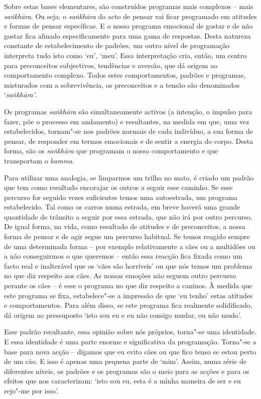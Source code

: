 Sobre estas bases elementares, são construídos programas mais complexos -- mais
\emph{saṅkhāra}. Ou seja: o \emph{saṅkhāra} do acto de pensar vai ficar
programado em atitudes e formas de pensar específicas. E o nosso programa
emocional de gostar e de não gostar fica afinado especificamente para uma gama
de respostas. Desta natureza constante de estabelecimento de padrões, um outro
nível de programação interpreta tudo isto como `eu', `meu'. Essa interpretação
cria, então, um centro para preconceitos subjectivos, tendências e aversão, que
dá origem ao comportamento complexo. Todos estes comportamentos, padrões e
programas, misturados com a sobrevivência, os preconceitos e a tensão são
denominados `\emph{saṅkhāra'}.

Os programas \emph{saṅkhāra} são simultaneamente activos (a intenção, o impulso
para fazer, põe o processo em andamento) e resultantes, na medida em que, uma
vez estabelecidos, tornam"-se nos padrões normais de cada indivíduo, a sua forma
de pensar, de responder em termos emocionais e de sentir a energia do corpo.
Desta forma, são os \emph{saṅkhāra} que programam o nosso comportamento e que
transportam o \emph{kamma}.

Para utilizar uma analogia, se limparmos um trilho no mato, é criado um padrão
que tem como resultado encorajar os outros a seguir esse caminho. Se esse
percurso for seguido vezes suficientes temos uma autoestrada, um programa
estabelecido. Tal como os carros numa estrada, em breve haverá uma grande
quantidade de trânsito a seguir por essa estrada, que não irá por outro
percurso. De igual forma, na vida, como resultado de atitudes e de preconceitos,
a nossa forma de pensar e de agir segue um percurso habitual. Se temos reagido
sempre de uma determinada forma -- por exemplo relativamente a cães ou a
multidões ou a não conseguirmos o que queremos -- então essa reacção fica fixada
como um facto real e inalterável que os `cães são horríveis' ou que nós temos um
problema no que diz respeito aos cães. As nossas emoções não seguem outro
percurso perante os cães -- é esse o programa no que diz respeito a caninos. À
medida que este programa se fixa, estabelece"-se a impressão de que `eu tenho'
estas atitudes e comportamentos. Para além disso, se este programa fica
realmente solidificado, dá origem ao pressuposto `isto sou eu e eu não consigo
mudar, ou não mudo'. 

Esse padrão resultante, essa opinião sobre nós próprios, 
torna"-se uma identidade. E essa identidade é uma parte enorme e significativa da
programação. Torna"-se a base para nova acção -- digamos que eu evito cães ou que
fico tenso se estou perto de um cão. E isso é apenas uma pequena parte de `mim'.
Assim, numa série de diferentes níveis, os padrões e os programas são o meio
para as acções e para os efeitos que nos caracterizam: `isto sou eu, esta é a
minha maneira de ser e eu rejo"-me por isso'.

